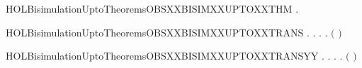 \newcommand{\HOLBisimulationUptoTheoremsOBSXXBISIMXXUPTOXXEPSYY}{\UseVerbatim{HOLBisimulationUptoTheoremsOBSXXBISIMXXUPTOXXEPSYY}}
\begin{SaveVerbatim}{HOLBisimulationUptoTheoremsOBSXXBISIMXXUPTOXXTHM}
\HOLTokenTurnstile{} \HOLSymConst{\HOLTokenForall{}}.   \HOLSymConst{\HOLTokenImp{}}   
\end{SaveVerbatim}
\newcommand{\HOLBisimulationUptoTheoremsOBSXXBISIMXXUPTOXXTHM}{\UseVerbatim{HOLBisimulationUptoTheoremsOBSXXBISIMXXUPTOXXTHM}}
\begin{SaveVerbatim}{HOLBisimulationUptoTheoremsOBSXXBISIMXXUPTOXXTRANS}
\HOLTokenTurnstile{} \HOLSymConst{\HOLTokenForall{}}.
         \HOLSymConst{\HOLTokenImp{}}
       \HOLSymConst{\HOLTokenForall{}} .
              \HOLSymConst{\HOLTokenImp{}}
           \HOLSymConst{\HOLTokenForall{}} .
                \HOLTokenTransBegin{}\HOLTokenTransEnd {} \HOLSymConst{\HOLTokenImp{}}
               \HOLSymConst{\HOLTokenExists{}}.
                    \HOLTokenWeakTransBegin{}\HOLTokenWeakTransEnd {} \HOLSymConst{\HOLTokenConj{}}
                   \ensuremath{(}    \ensuremath{)}  
\end{SaveVerbatim}
\newcommand{\HOLBisimulationUptoTheoremsOBSXXBISIMXXUPTOXXTRANS}{\UseVerbatim{HOLBisimulationUptoTheoremsOBSXXBISIMXXUPTOXXTRANS}}
\begin{SaveVerbatim}{HOLBisimulationUptoTheoremsOBSXXBISIMXXUPTOXXTRANSYY}
\HOLTokenTurnstile{} \HOLSymConst{\HOLTokenForall{}}.
         \HOLSymConst{\HOLTokenImp{}}
       \HOLSymConst{\HOLTokenForall{}} .
              \HOLSymConst{\HOLTokenImp{}}
           \HOLSymConst{\HOLTokenForall{}} .
                \HOLTokenTransBegin{}\HOLTokenTransEnd {} \HOLSymConst{\HOLTokenImp{}}
               \HOLSymConst{\HOLTokenExists{}}.
                    \HOLTokenWeakTransBegin{}\HOLTokenWeakTransEnd {} \HOLSymConst{\HOLTokenConj{}}
                   \ensuremath{(}    \ensuremath{)}  
\end{SaveVerbatim}
